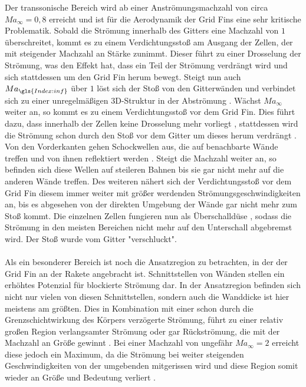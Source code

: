 Der transsonische Bereich wird ab einer Anströmungsmachzahl von circa $Ma_\infty=0,8$ erreicht \cite{machgrenzen} und ist für die Aerodynamik der Grid Fins eine sehr kritische Problematik. Sobald die Strömung innerhalb des Gitters eine Machzahl von $1$ überschreitet, kommt es zu einem Verdichtungsstoß am Ausgang der Zellen, der mit steigender Machzahl an Stärke zunimmt. Dieser führt zu einer Drosselung der Strömung, was den Effekt hat, dass ein Teil der Strömung verdrängt wird und sich stattdessen um den Grid Fin herum bewegt. Steigt nun auch $Ma_{\gls{Index:inf}}$ über $1$ löst sich der Stoß von den Gitterwänden und verbindet sich zu einer unregelmäßigen 3D-Struktur in der Abströmung \cite{stroemung}. Wächst $Ma_\infty$ weiter an, so kommt es zu einem Verdichtungsstoß vor dem Grid Fin. Dies führt dazu, dass innerhalb der Zellen keine Drosselung mehr vorliegt \cite{stroemung}, stattdessen wird die Strömung schon durch den Stoß vor dem Gitter um dieses herum verdrängt \cite{synopsis}. Von den Vorderkanten gehen Schockwellen aus, die auf benachbarte Wände treffen und von ihnen reflektiert werden \cite{synopsis}. Steigt die Machzahl weiter an, so befinden sich diese Wellen auf steileren Bahnen bis sie gar nicht mehr auf die anderen Wände treffen. Des weiteren nähert sich der Verdichtungsstoß vor dem Grid Fin diesem immer weiter mit größer werdenden Strömungsgeschwindigkeiten an, bis es abgesehen von der direkten Umgebung der Wände gar nicht mehr zum Stoß kommt. Die einzelnen Zellen fungieren nun als Überschalldüse \cite{stroemung}, sodass die Strömung in den meisten Bereichen nicht mehr auf den Unterschall abgebremst wird. Der Stoß wurde vom Gitter "verschluckt".
\\~\\
Als ein besonderer Bereich ist noch die Ansatzregion zu betrachten, in der der Grid Fin an der Rakete angebracht ist. Schnittstellen von Wänden stellen ein erhöhtes Potenzial für blockierte Strömung dar. In der Ansatzregion befinden sich nicht nur vielen von diesen Schnittstellen, sondern auch die Wanddicke ist hier meistens am größten. Dies in Kombination mit einer schon durch die Grenzschichtwirkung des Körpers verzögerte Strömung, führt zu einer relativ großen Region verlangsamter Strömung oder gar Rückströmung, die mit der Machzahl an Größe gewinnt \cite{stroemung}. Bei einer Machzahl von ungefähr $Ma_\infty = 2$ erreicht diese jedoch ein Maximum, da die Strömung bei weiter steigenden Geschwindigkeiten von der umgebenden mitgerissen wird und diese Region somit wieder an Größe und Bedeutung verliert \cite{stroemung}.


